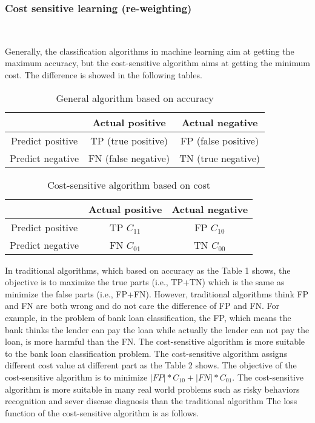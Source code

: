 \subsubsection{Cost sensitive learning (re-weighting)}\


Generally, the classification algorithms in machine learning aim at getting the maximum accuracy, but the cost-sensitive algorithm aims at getting the minimum cost. The difference is showed in the following tables.


\begin{table} 
\centering
\caption{General algorithm based on accuracy}  
\begin{tabular}{|c|c|c|}
\hline  
 & Actual positive  & Actual negative \\  
\hline  
Predict positive  & TP (true positive) & FP (false positive) \\  
Predict negative  & FN (false negative) & TN (true negative) \\  
\hline  
\end{tabular}  
\end{table}

\begin{table} 
\centering
\caption{Cost-sensitive algorithm based on cost}  
\begin{tabular}{|c|c|c|}
\hline  
 & Actual positive  & Actual negative \\  
\hline  
\centering
Predict positive  & TP $C_{11}$ & FP $C_{10}$ \\  
Predict negative  & FN $C_{01}$ & TN $C_{00}$ \\  
\hline  
\end{tabular}  
\end{table}

In traditional algorithms, which based on accuracy as the Table 1 shows, the objective is to maximize the true parts (i.e., TP+TN) which is the same as minimize the false parts (i.e., FP+FN). However, traditional algorithms think FP and FN are both wrong and do not care the difference of FP and FN. For example, in the problem of bank loan classification, the FP, which means the bank thinks the lender can pay the loan while actually the lender can not pay the loan, is more harmful than the FN. The cost-sensitive algorithm is more suitable to the bank loan classification problem. The cost-sensitive algorithm assigns different cost value at different part as the Table 2 shows. The objective of the cost-sensitive algorithm is to minimize $|FP|*C_{10}+|FN|*C_{01}$. The cost-sensitive algorithm is more suitable in many real world problems such as risky behaviors recognition and sever disease diagnosis than the traditional algorithm 
The loss function of the cost-sensitive algorithm is as follows.

